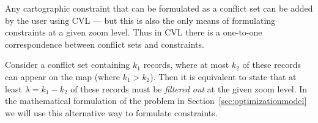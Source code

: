 Any cartographic constraint that can be formulated as a conflict set can be added by the user using CVL --- but this is also the only means of formulating constraints at a given zoom level. Thus in CVL there is a one-to-one correspondence between conflict sets and constraints. 

Consider a conflict set containing $k_1$ records, where at most $k_2$ of these records can appear on the map (where $k_1 > k_2$). Then it is equivalent to state that at least $\lambda = k_1 - k_2$ of these records must be \emph{filtered out} at the given zoom level. In the mathematical formulation of the problem in Section~\ref{sec:optimizationmodel} we will use this alternative way to formulate constraints.





